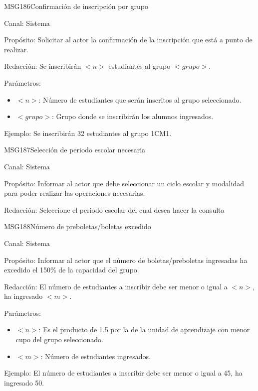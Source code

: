 \begin{mensaje}{MSG186}{Confirmación de inscripción por grupo}
	\item[Canal:] Sistema
	\item[Propósito:] Solicitar al actor la confirmación de la inscripción que está a punto de realizar.
	\item[Redacción:] Se inscribirán $<n>$ estudiantes al grupo $<grupo>$.
		\item[Parámetros:] 
		\begin{itemize}
			\item $<n>$: Número de estudiantes que serán inscritos al grupo seleccionado.
			\item $<grupo>$: Grupo donde se inscribirán los alumnos ingresados.
		\end{itemize}
		\item[Ejemplo:]  Se inscribirán 32 estudiantes al grupo 1CM1.
\end{mensaje}

\begin{mensaje}{MSG187}{Selección de periodo escolar necesaria}
	\item[Canal:] Sistema
	\item[Propósito:] Informar al actor que debe seleccionar un ciclo escolar y modalidad para poder realizar las operaciones necesarias.
	\item[Redacción:] Seleccione el periodo escolar del cual desea hacer la consulta
\end{mensaje}

\begin{mensaje}{MSG188}{Número de preboletas/boletas excedido}
	\item[Canal:] Sistema
	\item[Propósito:] Informar al actor que el número de boletas/preboletas ingresadas ha excedido el 150\% de la capacidad del grupo.
	\item[Redacción:] El número de estudiantes a inscribir debe ser menor o igual a $<n>$, ha ingresado $<m>$.
		\item[Parámetros:] 
		\begin{itemize}
			\item $<n>$: Es el producto de 1.5 por la  de la unidad de aprendizaje con menor cupo del grupo seleccionado.
			\item $<m>$: Número de estudiantes ingresados.
		\end{itemize}
		\item[Ejemplo:] El número de estudiantes a inscribir debe ser menor o igual a 45, ha ingresado 50.
\end{mensaje}

